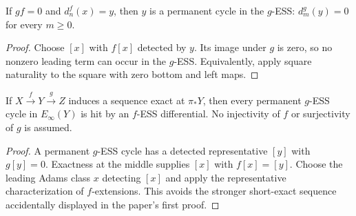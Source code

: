 \begin{corollary}
  \label{cor:fess-zero-composite-permanent}
  \notready
  If $gf=0$ and $d_n^f(x)=y$, then $y$ is a permanent cycle in the $g$-ESS:
  $d_m^g(y)=0$ for every $m\ge0$.
\end{corollary}

\begin{proof}
  Choose $[x]$ with $f[x]$ detected by $y$.  Its image under $g$ is zero, so
  no nonzero leading term can occur in the $g$-ESS.  Equivalently, apply square
  naturality to the square with zero bottom and left maps.
\end{proof}

\begin{proposition}
  \label{prop:fess-exact-middle-boundary}
  \notready
  If $X\xrightarrow fY\xrightarrow gZ$ induces a sequence exact at
  $\pi_*Y$, then every permanent $g$-ESS cycle in $E_\infty(Y)$ is hit by an
  $f$-ESS differential.  No injectivity of $f$ or surjectivity of $g$ is
  assumed.
\end{proposition}

\begin{proof}
  A permanent $g$-ESS cycle has a detected representative $[y]$ with
  $g[y]=0$.  Exactness at the middle supplies $[x]$ with $f[x]=[y]$.
  Choose the leading Adams class $x$ detecting $[x]$ and apply the
  representative characterization of $f$-extensions.  This avoids the
  stronger short-exact sequence accidentally displayed in the paper's first
  proof.
\end{proof}
